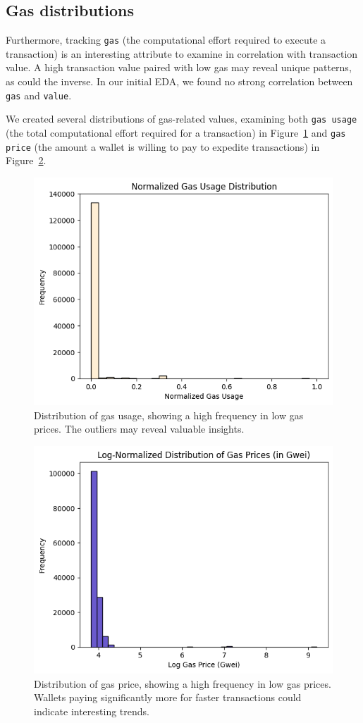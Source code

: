 \documentclass[sigconf]{acmart}
\begin{document}
\subsection{Gas distributions}
Furthermore, tracking \texttt{gas} (the computational effort required to execute a transaction) is an interesting attribute to examine in correlation with transaction value. A high transaction value paired with low gas may reveal unique patterns, as could the inverse. In our initial EDA, we found no strong correlation between \texttt{gas} and \texttt{value}.

We created several distributions of gas-related values, examining both \texttt{gas usage} (the total computational effort required for a transaction) in Figure~\ref{fig:gasUsage} and \texttt{gas price} (the amount a wallet is willing to pay to expedite transactions) in Figure~\ref{fig:gasPrice}.

\begin{figure}[H]
    \centering
    \includegraphics[width=0.8\linewidth]{M4-normalized-distro-gas.png}
    \caption{Distribution of gas usage, showing a high frequency in low gas prices. The outliers may reveal valuable insights.}
    \label{fig:gasUsage}
\end{figure}

\begin{figure}[H]
    \centering
    \includegraphics[width=0.8\linewidth]{M4-normalized-distro-gas-price.png}
    \caption{Distribution of gas price, showing a high frequency in low gas prices. Wallets paying significantly more for faster transactions could indicate interesting trends.}
    \label{fig:gasPrice}
\end{figure}
\end{document}

